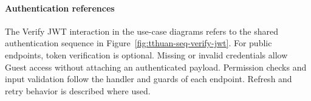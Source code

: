 \paragraph{Authentication references}
The Verify JWT interaction in the use-case diagrams refers to the shared
authentication sequence in Figure~\ref{fig:tthuan-seq-verify-jwt}.
For public endpoints, token verification is optional. Missing or invalid
credentials allow Guest access without attaching an authenticated payload.
Permission checks and input validation follow the handler and guards of
each endpoint. Refresh and retry behavior is described where used.
